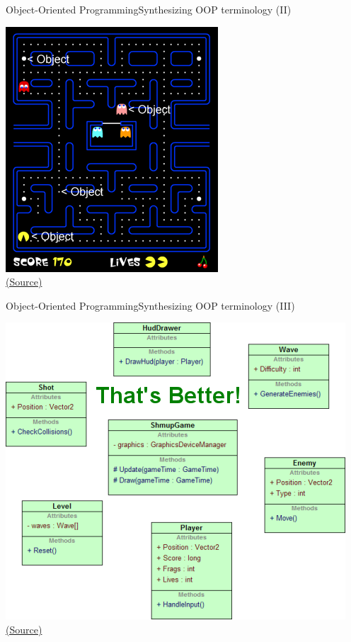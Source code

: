 \documentclass[10pt,compress]{beamer} %
\begin{document}
\begin{frame}[plain]{Object-Oriented Programming}{Synthesizing OOP terminology (II)}
	\begin{center}
	\includegraphics[width=0.6\linewidth]{figs/pacman}\\
	\smallskip
	\tiny{\href{http://blog.sklambert.com/introduction-to-oop-for-game-development/}{(Source)}}
	\end{center}
\end{frame}

\begin{frame}[plain]{Object-Oriented Programming}{Synthesizing OOP terminology (III)}
	\begin{center}
    	\centering \includegraphics[width=0.8\linewidth]{figs/gameObjects}\\
		\smallskip
		\tiny{\href{http://blog.nuclex-games.com/2010/01/game-architecture-day-2/}{(Source)}}
	\end{center}
\end{frame}
\end{document}
